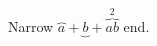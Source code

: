 \documentclass[12pt]{article}
\begin{document}
Narrow $\overbrace{a} + \underbrace{b} + \overbrace{ab}^{2}$ end.
\end{document}
